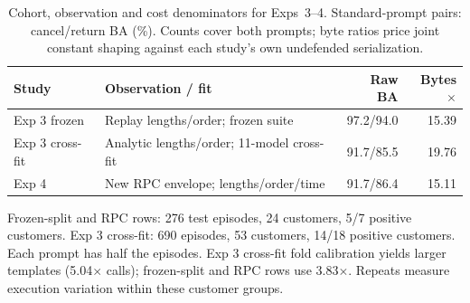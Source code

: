 \begin{table}[t]\centering\footnotesize
\caption{Cohort, observation and cost denominators for Exps~3--4. Standard-prompt pairs: cancel/return BA (\%). Counts cover both prompts; byte ratios price joint constant shaping against each study's own undefended serialization.}\label{tab:r7-cohorts}
\begin{tabularx}{\columnwidth}{@{}p{}Yrr@{}}\toprule
Study & Observation / fit & Raw BA & Bytes$\times$\\\midrule
Exp 3 frozen & Replay lengths/order; frozen suite & 97.2/94.0 & 15.39\\
Exp 3 cross-fit & Analytic lengths/order; 11-model cross-fit & 91.7/85.5 & 19.76\\
Exp 4 & New RPC envelope; lengths/order/time & 91.7/86.4 & 15.11\\\bottomrule
\end{tabularx}
\par\smallskip\raggedright Frozen-split and RPC rows: 276 test episodes, 24 customers, 5/7 positive customers. Exp 3 cross-fit: 690 episodes, 53 customers, 14/18 positive customers. Each prompt has half the episodes. Exp 3 cross-fit fold calibration yields larger templates (5.04$\times$ calls); frozen-split and RPC rows use 3.83$\times$. Repeats measure execution variation within these customer groups.
\end{table}
